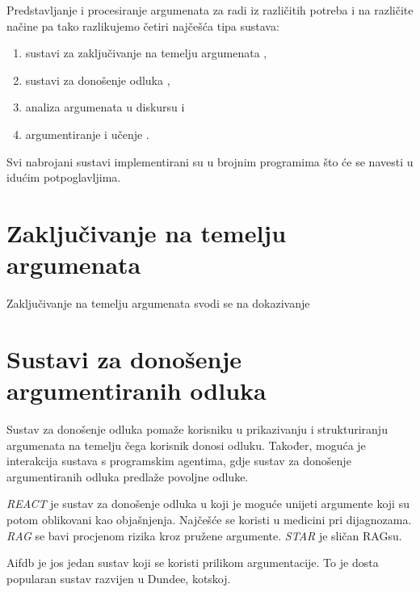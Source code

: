 Predstavljanje i procesiranje argumenata za radi iz različitih potreba i na
različite načine pa tako razlikujemo četiri najčešća tipa sustava:

\begin{enumerate} 
    \item sustavi za zaključivanje na temelju argumenata
    , 
    \item sustavi za donošenje
    odluka , 
    \item analiza argumenata u diskursu  i 
    \item argumentiranje i učenje .  
\end{enumerate}

Svi nabrojani sustavi implementirani su u brojnim programima što će se navesti
u idućim potpoglavljima.


\section{Zaključivanje na temelju argumenata}

Zaključivanje na temelju argumenata svodi se na dokazivanje 

\section{Sustavi za donošenje argumentiranih odluka}

Sustav za donošenje odluka pomaže korisniku u prikazivanju i strukturiranju
argumenata na temelju čega korisnik donosi odluku. Također, moguća je
interakcija sustava s programskim agentima, gdje sustav za donošenje
argumentiranih odluka predlaže povoljne odluke.

\emph{REACT} je sustav za donošenje odluka u koji je moguće unijeti argumente
koji su potom oblikovani kao objašnjenja. Najčešće se koristi u medicini pri
dijagnozama. \emph{RAG} se bavi procjenom rizika  kroz
pružene argumente. \emph{STAR} je sličan RAGsu. 

Aifdb je jos jedan sustav koji se koristi prilikom argumentacije. 
To je dosta popularan sustav razvijen u Dundee, kotskoj. 
